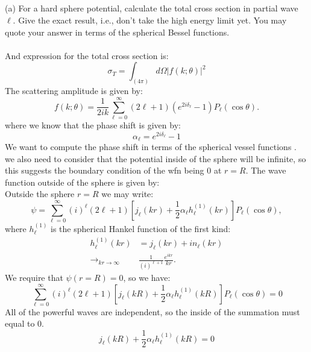 \documentclass[12pt]{article}
\begin{document}
\subsection{}
(a) For a hard sphere potential, calculate the total cross section in partial wave $\ell$. Give the exact result, i.e., don't take the high energy limit yet. You may quote your answer in terms of the spherical Bessel functions.\\\\
And expression for the total cross section is:
\begin{equation}
\sigma_T=\int_{(4 \pi)} d \Omega|f(k ; \theta)|^2
\end{equation}
The scattering amplitude is given by:
\begin{equation}
f(k ; \theta)=\frac{1}{2 i k} \sum_{\ell=0}^{\infty}(2 \ell+1)\left(e^{2 i \delta_{\ell}}-1\right) P_{\ell}(\cos \theta) .
\end{equation}
where we know that the phase shift is given by:
\begin{equation}
\alpha_{\ell}=e^{2 i \delta_{\ell}}-1
\end{equation}
We want to compute the phase shift in terms of the spherical vessel functions . we also need to consider that the potential inside of the sphere will be infinite, so this suggests the boundary condition of the wfn being 0 at $r=R$.
The wave function outside of the sphere is given by:\\
Outside the sphere $r=R$ we may write:
$$
\psi=\sum_{\ell=0}^{\infty}(i)^{\ell}(2 \ell+1)\left[j_{\ell}(k r)+\frac{1}{2} \alpha_{\ell} h_{\ell}^{(1)}(k r)\right] P_{\ell}(\cos \theta),
$$
where $h_{\ell}^{(1)}$ is the spherical Hankel function of the first kind:
$$
\begin{aligned}
h_{\ell}^{(1)}(k r) & =j_{\ell}(k r)+i n_{\ell}(k r) \\
\rightarrow_{k r \rightarrow \infty} & \frac{1}{(i)^{\ell+1}} \frac{e^{i k r}}{k r} .
\end{aligned}
$$
We require that $\psi (r=R)=0$, so we have:
\begin{equation}
\sum_{\ell=0}^{\infty}(i)^{\ell}(2 \ell+1)\left[j_{\ell}(k R)+\frac{1}{2} \alpha_{\ell} h_{\ell}^{(1)}(k R)\right] P_{\ell}(\cos \theta)=0
\end{equation}
All of the powerful waves are independent, so the inside of the summation must equal to 0.
\begin{equation}
j_{\ell}(k R)+\frac{1}{2} \alpha_{\ell} h_{\ell}^{(1)}(k R)=0
\end{equation}
\end{document}
